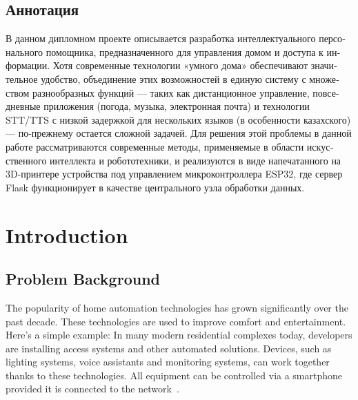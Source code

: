 \begin{otherlanguage}{russian}
\chapter*{Аннотация}
В данном дипломном проекте описывается разработка интеллектуального персонального помощника, предназначенного для управления домом и доступа к информации. Хотя современные технологии «умного дома» обеспечивают значительное удобство, объединение этих возможностей в единую систему с множеством разнообразных функций — таких как дистанционное управление, повседневные приложения (погода, музыка, электронная почта) и технологии STT/TTS с низкой задержкой для нескольких языков (в особенности казахского) — по-прежнему остается сложной задачей. Для решения этой проблемы в данной работе рассматриваются современные методы, применяемые в области искусственного интеллекта и робототехники, и реализуются в виде напечатанного на 3D-принтере устройства под управлением микроконтроллера ESP32, где сервер Flask функционирует в качестве центрального узла обработки данных.

\end{otherlanguage}

\tableofcontents
\chapter{Introduction}

\section{Problem Background}

The popularity of home automation technologies has grown significantly over the past decade. These technologies are used to improve comfort and entertainment. Here's a simple example: In many modern residential complexes today, developers are installing access systems and other automated solutions. Devices, such as lighting systems, voice assistants and monitoring systems, can work together thanks to these technologies. All equipment can be controlled via a smartphone provided it is connected to the network~\cite{technavio}.

